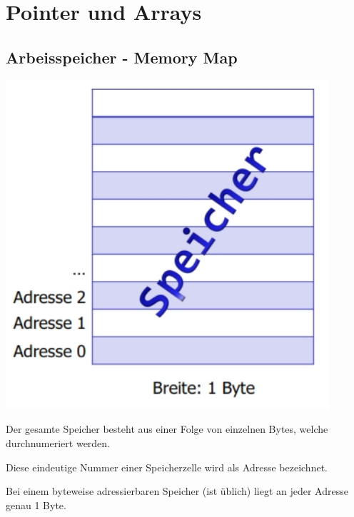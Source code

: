 \section{Pointer und Arrays }
	\begin{minipage}[t]{7 cm}
		\subsection{Arbeisspeicher - Memory Map }
			\includegraphics[width=0.9\textwidth]{pics/arbeitsspeicher.jpg}
			
			\begin{compactitem}
				\item Der gesamte Speicher besteht aus einer Folge von einzelnen Bytes, welche durchnumeriert werden.
				\item Diese eindeutige Nummer einer Speicherzelle wird als Adresse bezeichnet.
				\item Bei einem byteweise adressierbaren Speicher (ist üblich) liegt an jeder Adresse genau 1 Byte.
			\end{compactitem}
	\end{minipage}
	\hspace*{0.5cm}
